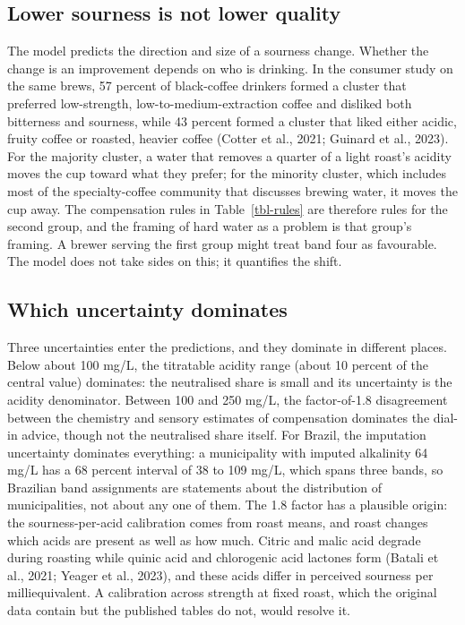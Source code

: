 \documentclass[
  a4paper,
]{article}
\begin{document}
\subsection{Lower sourness is not lower
quality}\label{lower-sourness-is-not-lower-quality}

The model predicts the direction and size of a sourness change. Whether
the change is an improvement depends on who is drinking. In the consumer
study on the same brews, 57 percent of black-coffee drinkers formed a
cluster that preferred low-strength, low-to-medium-extraction coffee and
disliked both bitterness and sourness, while 43 percent formed a cluster
that liked either acidic, fruity coffee or roasted, heavier coffee
(Cotter et al., 2021; Guinard et al., 2023). For the majority cluster, a
water that removes a quarter of a light roast's acidity moves the cup
toward what they prefer; for the minority cluster, which includes most
of the specialty-coffee community that discusses brewing water, it moves
the cup away. The compensation rules in Table~\ref{tbl-rules} are
therefore rules for the second group, and the framing of hard water as a
problem is that group's framing. A brewer serving the first group might
treat band four as favourable. The model does not take sides on this; it
quantifies the shift.

\subsection{Which uncertainty
dominates}\label{which-uncertainty-dominates}

Three uncertainties enter the predictions, and they dominate in
different places. Below about 100 mg/L, the titratable acidity range
(about 10 percent of the central value) dominates: the neutralised share
is small and its uncertainty is the acidity denominator. Between 100 and
250 mg/L, the factor-of-1.8 disagreement between the chemistry and
sensory estimates of compensation dominates the dial-in advice, though
not the neutralised share itself. For Brazil, the imputation uncertainty
dominates everything: a municipality with imputed alkalinity 64 mg/L has
a 68 percent interval of 38 to 109 mg/L, which spans three bands, so
Brazilian band assignments are statements about the distribution of
municipalities, not about any one of them. The 1.8 factor has a
plausible origin: the sourness-per-acid calibration comes from roast
means, and roast changes which acids are present as well as how much.
Citric and malic acid degrade during roasting while quinic acid and
chlorogenic acid lactones form (Batali et al., 2021; Yeager et al.,
2023), and these acids differ in perceived sourness per milliequivalent.
A calibration across strength at fixed roast, which the original data
contain but the published tables do not, would resolve it.
\end{document}
